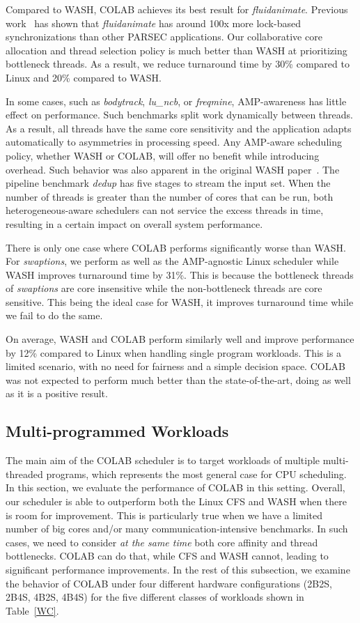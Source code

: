 Compared to WASH, COLAB achieves its best result for \emph{fluidanimate}. Previous work~\cite{bienia08characterization} has shown that \emph{fluidanimate} has around 100x more lock-based synchronizations than other PARSEC applications. Our collaborative core allocation and thread selection policy is much better than WASH at prioritizing bottleneck threads.  As a result, we reduce turnaround time by 30\% compared to Linux and 20\% compared to WASH.

In some cases, such as \emph{bodytrack}, \emph{lu\_ncb}, or \emph{freqmine}, AMP-awareness has little effect on performance. Such benchmarks split work dynamically between threads. As a result, all threads have the same core sensitivity and the application adapts automatically to asymmetries in processing speed. Any AMP-aware scheduling policy, whether WASH or COLAB, will offer no benefit while introducing overhead. Such behavior was also apparent in the original WASH paper~\cite{jibaja2016portable}. The pipeline benchmark \emph{dedup} has five stages to stream the input set. When the number of threads is greater than the number of cores that can be run, both heterogeneous-aware schedulers can not service the excess threads in time, resulting in a certain impact on overall system performance.

There is only one case where COLAB performs significantly worse than WASH. For \emph{swaptions}, we perform as well as the AMP-agnostic Linux scheduler while WASH improves turnaround time by 31\%. This is because the bottleneck threads of \emph{swaptions} are core insensitive while the non-bottleneck threads are core sensitive. This being the ideal case for WASH, it improves turnaround time while we fail to do the same.

On average, WASH and COLAB perform similarly well and improve performance by 12\% compared to Linux when handling single program workloads. This is a limited scenario, with no need for fairness and a simple decision space. COLAB was not expected to perform much better than the state-of-the-art, doing as well as it is a positive result.

\subsection{Multi-programmed Workloads}
The main aim of the COLAB scheduler is to target workloads of multiple multi-threaded programs, which represents the most general case for CPU scheduling. In this section, we evaluate the performance of COLAB in this setting. Overall, our scheduler is able to outperform both the Linux CFS and WASH when there is room for improvement. This is particularly true when we have a limited number of big cores and/or many communication-intensive benchmarks. In such cases, we need to consider \emph{at the same time} both core affinity and thread bottlenecks. COLAB can do that, while CFS and WASH cannot, leading to significant performance improvements. In the rest of this subsection, we examine the behavior of COLAB under four different hardware configurations (2B2S, 2B4S, 4B2S, 4B4S) for the five different classes of workloads shown in Table~\ref{WC}.

